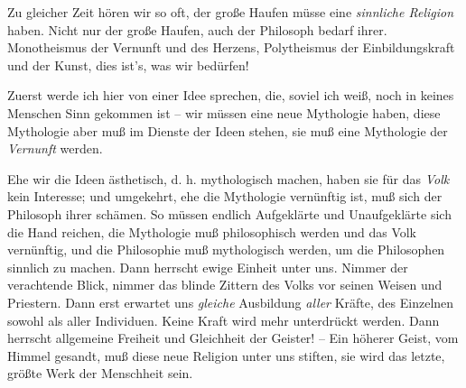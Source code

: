 \documentclass[12pt,letterpaper]{article} %
\begin{document}
Zu gleicher Zeit hören wir so oft, der große Haufen müsse eine \textit{sinnliche Religion} haben. Nicht nur der große Haufen, auch der Philosoph bedarf ihrer. Monotheismus der Vernunft und des Herzens, Polytheismus der Einbildungskraft und der Kunst, dies ist's, was wir bedürfen!

Zuerst werde ich hier von einer Idee sprechen, die, soviel ich weiß, noch in keines Menschen Sinn gekommen ist – wir müssen eine neue Mythologie haben, diese Mythologie aber muß im Dienste der Ideen stehen, sie muß eine Mythologie der \textit{Vernunft} werden.

Ehe wir die Ideen ästhetisch, d. h. mythologisch machen, haben sie für das \textit{Volk} kein Interesse; und umgekehrt, ehe die Mythologie vernünftig ist, muß sich der Philosoph ihrer schämen. So müssen endlich Aufgeklärte und Unaufgeklärte sich die Hand reichen, die Mythologie muß philosophisch werden und das Volk vernünftig, und die Philosophie muß mythologisch werden, um die Philosophen sinnlich zu machen. Dann herrscht ewige Einheit unter uns. Nimmer der verachtende Blick, nimmer das blinde Zittern des Volks vor seinen Weisen und Priestern. Dann erst erwartet uns \textit{gleiche} Ausbildung \textit{aller} Kräfte, des Einzelnen sowohl als aller Individuen. Keine Kraft wird mehr unterdrückt werden. Dann herrscht allgemeine Freiheit und Gleichheit der Geister! – Ein höherer Geist, vom Himmel gesandt, muß diese neue Religion unter uns stiften, sie wird das letzte, größte Werk der Menschheit sein.
\end{document}

